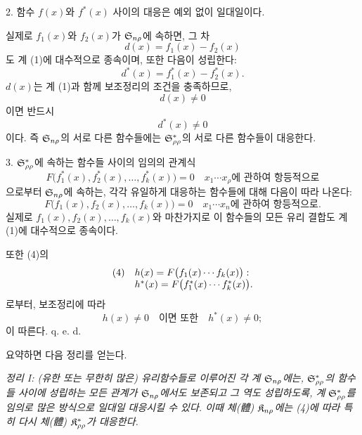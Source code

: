 2. 함수 $f(x)$와 $f^*(x)$ 사이의 대응은 예외 없이 일대일이다.

실제로 $f_1(x)$와 $f_2(x)$가 $\mathfrak S_{n\rho}$에 속하면, 그 차
\[
d(x)=f_1(x)-f_2(x)
\]
도 계 (1)에 대수적으로 종속이며, 또한 다음이 성립한다:
\[
d^*(x)=f_1^*(x)-f_2^*(x).
\]
$d(x)$는 계 (1)과 함께 보조정리의 조건을 충족하므로,
\[
d(x)\ne0
\]
이면 반드시
\[
d^*(x)\ne0
\]
이다. 즉 $\mathfrak S_{n\rho}$의 서로 다른 함수들에는 $\mathfrak S^*_{\rho\rho}$의 서로 다른 함수들이 대응한다.

3. $\mathfrak S^*_{\rho\rho}$에 속하는 함수들 사이의 임의의 관계식
\[
F\bigl(f_1^*(x),f_2^*(x),\ldots,f_k^*(x)\bigr)=0
\quad\text{$x_1\cdots x_\rho$에 관하여 항등적으로}
\]
으로부터 $\mathfrak S_{n\rho}$에 속하는, 각각 유일하게 대응하는 함수들에 대해 다음이 따라 나온다:
\[
F\bigl(f_1(x),f_2(x),\ldots,f_k(x)\bigr)=0
\quad\text{$x_1\cdots x_n$에 관하여 항등적으로}.
\]
실제로 $f_1(x),f_2(x),\ldots,f_k(x)$와 마찬가지로 이 함수들의 모든 유리 결합도 계 (1)에 대수적으로 종속이다.

또한 (4)의
\[
\begin{array}{@{}l@{\quad}l@{}}
(4)& h(x)=F\bigl(f_1(x)\cdots f_k(x)\bigr):\\
& h^*(x)=F\bigl(f_1^*(x)\cdots f_k^*(x)\bigr).
\end{array}
\]
로부터, 보조정리에 따라
\[
h(x)\ne0\quad\text{이면 또한}\quad h^*(x)\ne0;
\]
이 따른다.
q. e. d.

요약하면 다음 정리를 얻는다.

\emph{정리 I: (유한 또는 무한히 많은) 유리함수들로 이루어진 각 계 $\mathfrak S_{n\rho}$에는, $\mathfrak S^*_{\rho\rho}$의 함수들 사이에 성립하는 모든 관계가 $\mathfrak S_{n\rho}$에서도 보존되고 그 역도 성립하도록, 계 $\mathfrak S^*_{\rho\rho}$를 임의로 많은 방식으로 일대일 대응시킬 수 있다. 이때 체(體) $\mathfrak K_{n\rho}$에는 (4)에 따라 특히 다시 체(體) $\mathfrak K^*_{\rho\rho}$가 대응한다.}


